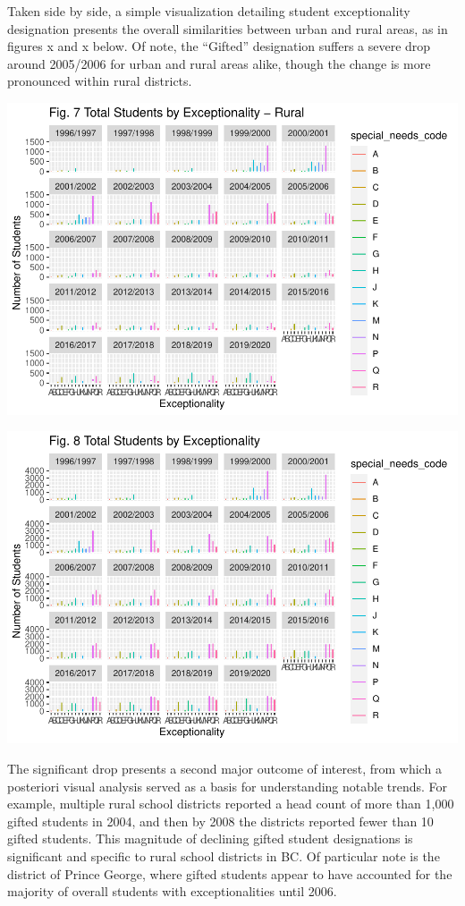 \documentclass[
  english,
  man,floatsintext]{apa6}
\begin{document}
Taken side by side, a simple visualization detailing student exceptionality designation presents the overall similarities between urban and rural areas, as in figures x and x below. Of note, the \enquote{Gifted} designation suffers a severe drop around 2005/2006 for urban and rural areas alike, though the change is more pronounced within rural districts.

\includegraphics{Final_project_files/figure-latex/rural facet bars-1.pdf}

\includegraphics{Final_project_files/figure-latex/urban facet bars-1.pdf}

The significant drop presents a second major outcome of interest, from which a posteriori visual analysis served as a basis for understanding notable trends. For example, multiple rural school districts reported a head count of more than 1,000 gifted students in 2004, and then by 2008 the districts reported fewer than 10 gifted students. This magnitude of declining gifted student designations is significant and specific to rural school districts in BC. Of particular note is the district of Prince George, where gifted students appear to have accounted for the majority of overall students with exceptionalities until 2006.
\end{document}
